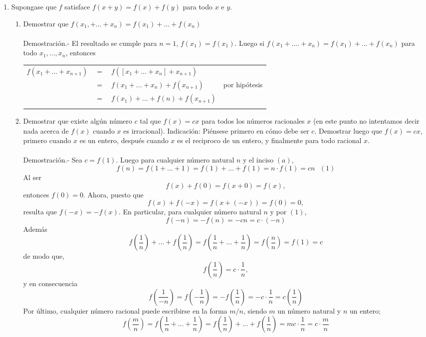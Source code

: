 \begin{enumerate}[\bfseries 1.]
\begin{enumerate}[\bfseries (a)]
	\end{enumerate}

	\item Supongase que $f$ satisface $f(x+y)=f(x)+f(y)$ para todo $x$ e $y$. 

	\begin{enumerate}[\bfseries (a)]

	    \item Demostrar que $f(x_1,+...+x_n)=f(x_1)+...+f(x_n)$\\\\
	    Demostración.-\; El resultado se cumple para $n=1$, $f(x_1)=f(x_1)$. Luego si $f(x_1 + .... + x_n)=f(x_1)+ ... + f(x_n)$ para todo $x_1,...,x_n$, entonces
	    \begin{center}
		\begin{tabular}{rcll}
		    $f(x_1 + ... + x_{n+1})$ & $=$ & $f(\left[x_1 + ... + x_n\right]+x_{n+1})$&\\
		       & $=$ & $f(x_1 + ... + x_n) + f(x_{n+1})$&por hipótesis\\
		       & $=$ & $f(x_1)+...+f(n)+f(x_{n+1})$&\\\\
		\end{tabular}
	    \end{center}

	    \item Demostrar que existe algún número $c$ tal que $f(x)=cx$ para todos los números racionales $x$ (en este punto no intentamos decir nada acerca de $f(x)$ cuando $x$ es irracional). Indicación: Piénsese primero en cómo debe ser $c$. Demostrar luego que $f(x)=cx$, primero cuando $x$ es un entero, después cuando $x$ es el reciproco de un entero, y finalmente para todo racional $x$.\\\\
	    Demostración.-\; Sea $c=f(1)$. Luego para cualquier número natural $n$ y el inciso $(a)$,  $$f(n)=f(1+...+1)=f(1)+...+f(1)=n\cdot f(1)=cn \,\,\,\, (1)$$ 
	    Al ser $$f(x)+f(0)=f(x+0)=f(x),$$ entonces $f(0)=0$. Ahora, puesto que $$f(x)+f(-x)=f(x+(-x))=f(0)=0,$$ 
	    resulta que $f(-x)=-f(x)$. En particular, para cualquier número natural $n$ y por $(1)$, $$f(-n)=-f(n)=-cn=c\cdot (-n)$$
	    Además $$f\left(\dfrac{1}{n}\right) + ... + f\left(\dfrac{1}{n}\right)=f\left(\dfrac{1}{n} + ... + \dfrac{1}{n}\right)=f\left( \dfrac{n}{n}\right)=f(1)=c$$ de modo que, $$f\left(\dfrac{1}{n}\right)=c\cdot \dfrac{1}{n},$$
	    y en consecuencia $$f\left(\dfrac{1}{-n}\right)=f\left(- \dfrac{1}{n}\right)=-f\left(\dfrac{1}{n}\right)=-c \cdot \dfrac{1}{n} = c \left(\dfrac{1}{n}\right)$$
	    Por último, cualquier número racional puede escribirse en la forma $m/n$, siendo $m$ un número natural y $n$ un entero;
	    $$f\left(\dfrac{m}{n}\right)=f\left(\dfrac{1}{n} + ... + \dfrac{1}{n}\right)=f\left(\dfrac{1}{n}\right) + ... + f\left(\dfrac{1}{n}\right)=mc\cdot \dfrac{1}{n}=c\cdot \dfrac{m}{n}$$\\\\


\end{enumerate}
\end{enumerate}
